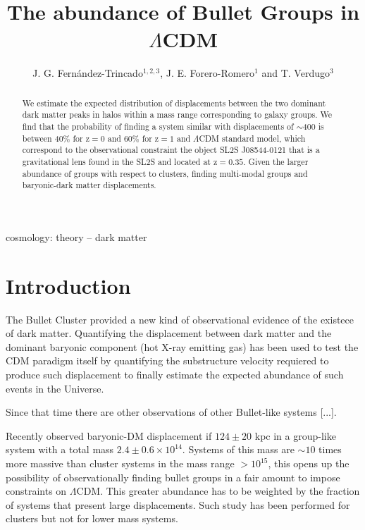 \documentclass{emulateapj}
\newcommand{\hkpc}{{\ifmmode{h^{-1}{\rm kpc}}\else{$h^{-1}$kpc }\fi}}
\newcommand{\hMsun}{{\ifmmode{h^{-1}{\rm {M_{\odot}}}}\else{$h^{-1}{\rm{M_{\odot}}}$}\fi}}
\newcommand{\Msun}{{\ifmmode{{\rm {M_{\odot}}}}\else{${\rm{M_{\odot}}}$}\fi}}
\begin{document}
 

\title{The abundance of Bullet Groups in $\Lambda$CDM}
\author{J. G. Fern\'andez-Trincado$^{1,2,3}$, J. E. Forero-Romero$^1$
  and T. Verdugo$^3$} 

\begin{abstract}

We estimate the expected distribution of displacements between the two
dominant dark matter peaks in halos within a mass range corresponding
to galaxy groups. We find that the probability of finding a system
similar with displacements of $\sim$400 \hkpc is between 40\%
for z$=0$ and 60\% for z$=1$ and $\Lambda$CDM standard model, which
correspond to the observational constraint the object SL2S J08544-0121
that is  a gravitational lens found in the SL2S and located at
z$=0.35$. Given the larger abundance of groups with respect to
clusters, finding multi-modal groups and baryonic-dark matter
displacements.  
\end{abstract}

\begin{keywords}
{cosmology: theory -- dark matter} 
\end{keywords}

\section{Introduction}


The Bullet Cluster provided a new kind of observational evidence of
the existece of dark matter. Quantifying the displacement between dark
matter and the dominant baryonic component (hot X-ray emitting gas)
\citep{ForeroRomero2010} has been used to test the CDM paradigm itself
by quantifying the substructure velocity requiered to produce such
displacement \citep{Hayashi2006} to finally estimate the expected
abundance of such events in the Universe. 


Since that time there are other observations of other Bullet-like
systems [...].

Recently \citep{Gastaldello} observed baryonic-DM displacement if
$124\pm 20$ kpc in a group-like system with a total mass $2.4\pm 0.6
\times 10^{14}$\Msun. Systems of this mass are $\sim 10$ times more massive
than cluster systems in the mass range $>10^{15}$\hMsun, this opens
up the possibility of observationally finding bullet groups in a fair
amount to impose constraints on $\Lambda$CDM. This greater abundance
has to be weighted by the fraction of systems that present large
displacements. Such study has been performed for clusters but not for
lower mass systems.
\end{document}
